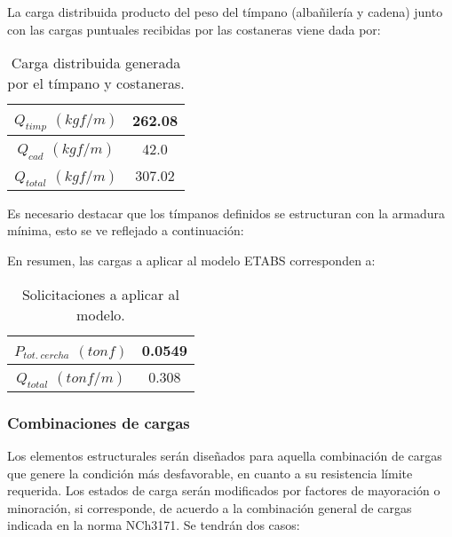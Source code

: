 \begin{itemize}
La carga distribuida producto del peso del tímpano (albañilería y cadena) junto con las cargas puntuales recibidas por las costaneras viene dada por:

\begin{table}[H]
  \centering
  \caption{Carga distribuida generada por el tímpano y costaneras.}
  \begin{tabular}{|c|c|}
    \hline
    \boldmath{}\textbf{$Q_{timp} $ $ (kgf/m)$}\unboldmath{} & 262.08 \bigstrut\\
    \hline
    \boldmath{}\textbf{$Q_{cad} $ $ (kgf/m)$}\unboldmath{} & 42.0 \bigstrut\\
    \hline
    \boldmath{}\textbf{$Q_{total} $ $ (kgf/m)$}\unboldmath{} & 307.02 \bigstrut\\
    \hline
  \end{tabular}
  \label{kdistr}
\end{table}

Es necesario destacar que los tímpanos definidos se estructuran con la armadura mínima, esto se ve reflejado a continuación:

    
\end{itemize}

En resumen, las cargas a aplicar al modelo ETABS corresponden a:

\begin{table}[H]
  \centering
  \caption{Solicitaciones a aplicar al modelo.}
  \begin{tabular}{|c|c|}
    \hline
    \boldmath{}\textbf{$P_{tot.\ cercha} $ $ (tonf)$}\unboldmath{} & 0.0549 \bigstrut\\
    \hline
    \boldmath{}\textbf{$Q_{total} $ $ (tonf/m)$}\unboldmath{} & 0.308 \bigstrut\\
    \hline
  \end{tabular}
  \label{solicitaciones}
\end{table}

\newpage
\subsubsection{Combinaciones de cargas} \label{combcargas}
    
    Los elementos estructurales serán diseñados para aquella combinación de cargas que genere la condición más desfavorable, en cuanto a su resistencia límite requerida. Los estados de carga serán modificados por factores de mayoración o minoración, si corresponde, de acuerdo a la combinación general de cargas indicada en la norma NCh3171. Se tendrán dos casos:
    \newcommand{\caquita}{0.8cm} 
    
